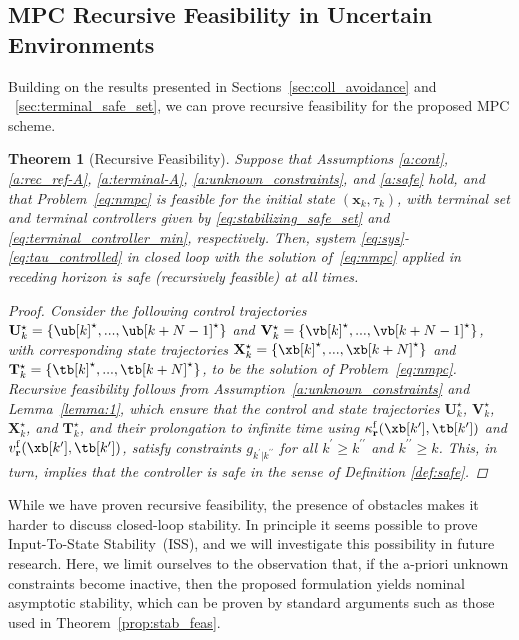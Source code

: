 \documentclass[journal]{IEEEtran}
\newcommand{\x}{{\mathbf{x}}}
\newcommand{\vv}{{{v}}}
\renewcommand{\r}{{\mathbf{r}}}
\newtheorem{Theorem}{Theorem}
\begin{document}
	
	\subsection{MPC Recursive Feasibility in Uncertain Environments}\label{sec:theorem}

		
	
	Building on the results presented in Sections~\ref{sec:coll_avoidance} and ~\ref{sec:terminal_safe_set}, we can prove recursive feasibility for the proposed MPC scheme.
	
	\begin{Theorem}[Recursive Feasibility]\label{theorem:1} Suppose that Assumptions \ref{a:cont}, \ref{a:rec_ref-A}, \ref{a:terminal-A}, \ref{a:unknown_constraints}, and \ref{a:safe} hold, and that Problem~\eqref{eq:nmpc} is feasible for the initial state $(\x_k,\tau_k)$, with terminal set and terminal controllers given by \eqref{eq:stabilizing_safe_set} and \eqref{eq:terminal_controller_min}, respectively. Then, system \eqref{eq:sys}-\eqref{eq:tau_controlled} in closed loop with the solution of~\eqref{eq:nmpc} applied in receding horizon is safe (recursively feasible) at all times.
		\begin{proof}
			Consider the following control trajectories $\mathbf{U}^\star_k=\{\ub[k]^\star,...,\ub[k+N-1]^\star\}$ and $\mathbf{V}^\star_k=\{\vb[k]^\star,...,\vb[k+N-1]^\star\}$, with corresponding state trajectories $\mathbf{X}_k^\star = \{\xb[k]^\star,...,\xb[k+N]^\star\}$ and $\mathbf{T}_k^\star = \{\tb[k]^\star,...,\tb[k+N]^\star\}$, to be the solution of Problem~\eqref{eq:nmpc}. Recursive feasibility follows from Assumption~\ref{a:unknown_constraints} and Lemma~\ref{lemma:1}, which ensure that the control and state trajectories $\mathbf{U}^\star_k$, $\mathbf{V}^\star_k$, $\mathbf{X}_k^\star$, and $\mathbf{T}_k^\star$, and their prolongation to infinite time using $\kappa_\r^\mathrm{f}(\xb[k^\prime],\tb[k^\prime])$ and $\vv_\r^\mathrm{f}(\xb[k^\prime],\tb[k^\prime])$, satisfy constraints $g_{k^{\prime}|k^{\prime\prime}}$ for all $k^{\prime}\geq{}k^{\prime\prime}$ and $k^{\prime\prime}\geq{}k$. This, in turn, implies that the controller is safe in the sense of Definition \ref{def:safe}.
		\end{proof}
	\end{Theorem}

	While we have proven recursive feasibility, the presence of obstacles makes it harder to discuss closed-loop stability. In principle it seems possible to prove Input-To-State Stability~(ISS), and we will investigate this possibility in future research. Here, we limit ourselves to the observation that, if the a-priori unknown constraints become inactive, then the proposed formulation yields nominal asymptotic stability, which can be proven by standard arguments such as those used in Theorem~\ref{prop:stab_feas}.
	
\end{document}
